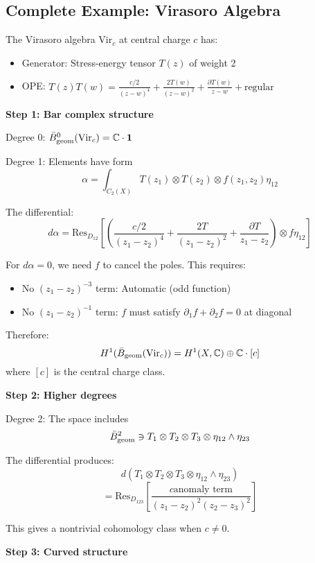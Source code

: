 \subsection{Complete Example: Virasoro Algebra}

\begin{example}
The Virasoro algebra $\text{Vir}_c$ at central charge $c$ has:
\begin{itemize}
\item Generator: Stress-energy tensor $T(z)$ of weight 2
\item OPE: $T(z)T(w) = \frac{c/2}{(z-w)^4} + \frac{2T(w)}{(z-w)^2} + \frac{\partial T(w)}{z-w} + \text{regular}$
\end{itemize}

\textbf{Step 1: Bar complex structure}

Degree 0: $\bar{B}_{\text{geom}}^0(\text{Vir}_c) = \mathbb{C} \cdot \mathbf{1}$

Degree 1: Elements have form
$$\alpha = \int_{C_2(X)} T(z_1) \otimes T(z_2) \otimes f(z_1, z_2)\eta_{12}$$

The differential:
$$d\alpha = \text{Res}_{D_{12}}\left[\left(\frac{c/2}{(z_1-z_2)^4} + \frac{2T}{(z_1-z_2)^2} + \frac{\partial T}{z_1-z_2}\right) \otimes f\eta_{12}\right]$$

For $d\alpha = 0$, we need $f$ to cancel the poles. This requires:
\begin{itemize}
\item No $(z_1-z_2)^{-3}$ term: Automatic (odd function)
\item No $(z_1-z_2)^{-1}$ term: $f$ must satisfy $\partial_1 f + \partial_2 f = 0$ at diagonal
\end{itemize}

Therefore:
$$H^1(\bar{B}_{\text{geom}}(\text{Vir}_c)) = H^1(X, \mathbb{C}) \oplus \mathbb{C} \cdot [c]$$
where $[c]$ is the central charge class.

\textbf{Step 2: Higher degrees}

Degree 2: The space includes
$$\bar{B}_{\text{geom}}^2 \ni T_1 \otimes T_2 \otimes T_3 \otimes \eta_{12} \wedge \eta_{23}$$

The differential produces:
$$d(T_1 \otimes T_2 \otimes T_3 \otimes \eta_{12} \wedge \eta_{23})$$
$$= \text{Res}_{D_{123}}\left[\frac{c \text{anomaly term}}{(z_1-z_2)^2(z_2-z_3)^2}\right]$$

This gives a nontrivial cohomology class when $c \neq 0$.

\textbf{Step 3: Curved structure}


\end{example}
